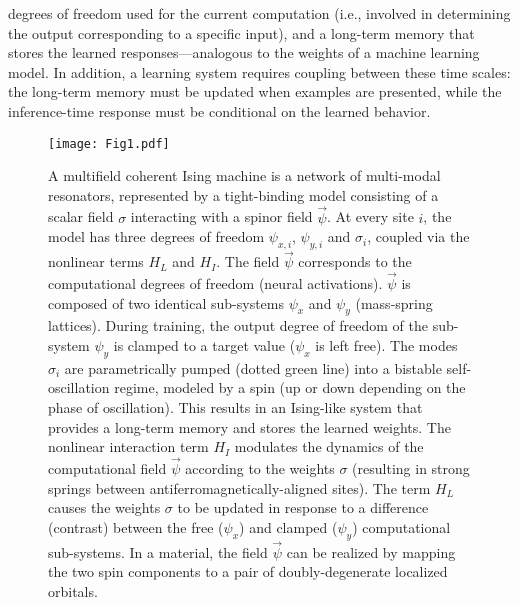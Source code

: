 degrees of freedom used for the current computation (i.e., involved in determining the output corresponding to a specific input), and a long-term memory that stores the learned responses---analogous to the weights of a machine learning model. In addition, a learning system requires coupling between these time scales: the long-term memory must be updated when examples are presented, while the inference-time response must be conditional on the learned behavior. 

\begin{figure}[!]
\texttt{[image: Fig1.pdf]}
\caption{\label{fig:epsart} A multifield coherent Ising machine is a network of multi-modal resonators, represented by a tight-binding model consisting of a scalar field $\sigma$ interacting with a spinor field $\vec{\psi}$. At every site $i$, the model has three degrees of freedom $\psi_{x,i}$, $\psi_{y,i}$ and $\sigma_{i}$, coupled via the nonlinear terms $H_L$ and $H_I$. The field $\vec{\psi}$ corresponds to the computational degrees of freedom (neural activations). $\vec{\psi}$ is composed of two identical sub-systems $\psi_x$ and $\psi_y$ (mass-spring lattices). During training, the output degree of freedom of the sub-system $\psi_y$ is clamped to a target value ($\psi_x$ is left free). The modes $\sigma_i$ are parametrically pumped (dotted green line) into a bistable self-oscillation regime, modeled by a spin (up or down depending on the phase of oscillation). This results in an Ising-like system that provides a long-term memory and stores the learned weights. The nonlinear interaction term $H_I$ modulates the dynamics of the computational field $\vec{\psi}$ according to the weights $\sigma$ (resulting in strong springs between antiferromagnetically-aligned sites). The term $H_L$ causes the weights $\sigma$ to be updated in response to a difference (contrast) between the free ($\psi_x$) and clamped ($\psi_y$) computational sub-systems. In a material, the field $\vec{\psi}$ can be realized by mapping the two spin components to a pair of doubly-degenerate localized orbitals. }
\vspace{-10pt}
\end{figure}

